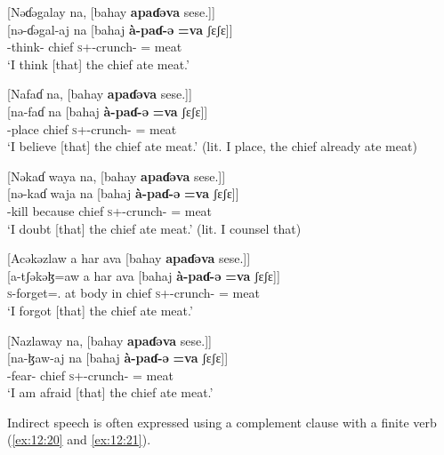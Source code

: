 \ea \label{ex:12:15}
{}[Nəɗəgalay  na,  [bahay  \textbf{apaɗəva}  sese.]]\\
\gll  {}[nə-ɗəgal-aj   na   [bahaj   \textbf{à-paɗ-ə} \textbf{=va}   ʃɛʃɛ]]\\
      {\oneS}-think{}-{\CL}  {\PSP}  chief  \textsc{s}+{\PFV}-crunch-{\CL}  ={\PRF}  meat\\
\glt  ‘I think [that] the chief ate meat.’ 
\z 

\ea \label{ex:12:16}
{}[Nafaɗ  na,  [bahay  \textbf{apaɗəva}  sese.]]\\
\gll  {}[na-faɗ   na   [bahaj   \textbf{à-paɗ-ə} \textbf{=va}    ʃɛʃɛ]]\\
      {\oneS}-place  {\PSP}  chief  \textsc{s}+{\PFV}-crunch-{\CL}  ={\PRF}  meat\\
\glt  ‘I believe [that] the chief ate meat.’ (lit. I place, the chief already ate meat) 
\z 

\ea \label{ex:12:17}
{}[Nəkaɗ  waya  na,  [bahay  \textbf{apaɗəva}  sese.]]\\
\gll  {}[nə-kaɗ   waja   na   [bahaj   \textbf{à-paɗ-ə} \textbf{=va}  ʃɛʃɛ]]\\
      {\oneS}-kill because {\PSP} chief \textsc{s}+{\PFV}-crunch-{\CL} ={\PRF}  meat\\
\glt  ‘I doubt [that] the chief ate meat.’  (lit. I counsel that) 
\z 

\ea \label{ex:12:18}
{}[Acəkəzlaw  a  har  ava  [bahay  \textbf{apaɗəva}  sese.]]\\
\gll  {}[a-tʃəkəɮ=aw   a  har  ava  [bahaj   \textbf{à-paɗ-ə} \textbf{=va} ʃɛʃɛ]]\\
      \textsc{s}-forget={\oneS}.{\IO}  at  body  in  chief  \textsc{s}+{\PFV}-crunch-{\CL}  ={\PRF}  meat\\
\glt  ‘I forgot [that] the chief ate meat.’  
\z 

\ea \label{ex:12:19}
{}[Nazlaway  na,  [bahay  \textbf{apaɗəva}  sese.]]\\
\gll  {}[na-ɮaw-aj   na   [bahaj   \textbf{à-paɗ-ə} \textbf{=va} ʃɛʃɛ]]\\
      {\oneS}-fear{}-{\CL}  {\PSP}  chief  \textsc{s}+{\PFV}-crunch-{\CL}  ={\PRF}  meat\\
\glt  ‘I am afraid [that] the chief ate meat.’
\z 

Indirect speech is often expressed using a complement clause with a finite verb (\ref{ex:12:20} and \ref{ex:12:21}).

